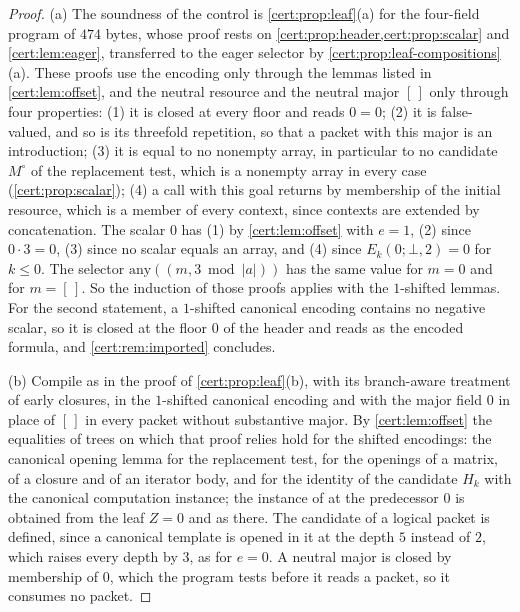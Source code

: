 \begin{proof}
(a) The soundness of the control is \cref{cert:prop:leaf}(a) for the
four-field program of $474$ bytes, whose proof rests on
\cref{cert:prop:header,cert:prop:scalar} and \cref{cert:lem:eager}, transferred
to the eager selector by \cref{cert:prop:leaf-compositions}(a). These proofs use
the encoding only through the lemmas listed in \cref{cert:lem:offset}, and the
neutral resource and the neutral major $[\,]$ only through four properties:
(1) it is closed at every floor and reads $0=0$; (2) it is false-valued, and
so is its threefold repetition, so that a packet with this major is an
introduction; (3) it is equal to no nonempty array, in particular to no
candidate $M^{\circ}$ of the replacement test, which is a nonempty array in
every case (\cref{cert:prop:scalar}); (4) a call with this goal returns by
membership of the initial resource, which is a member of every context, since
contexts are extended by concatenation. The scalar $0$ has (1) by
\cref{cert:lem:offset} with $e=1$, (2) since $0\cdot 3=0$, (3) since no scalar
equals an array, and (4) since $E_k(0;\bot,2)=0$ for $k\le 0$. The selector
$\mathrm{any}((m,3\bmod\lvert a\rvert))$ has the same value for $m=0$ and for
$m=[\,]$. So the induction of those proofs applies with the $1$-shifted lemmas.
For the second statement, a $1$-shifted canonical encoding contains no negative
scalar, so it is closed at the floor $0$ of the header and reads as the encoded
formula, and \cref{cert:rem:imported} concludes.

(b) Compile as in the proof of \cref{cert:prop:leaf}(b), with its
branch-aware treatment of early closures, in the $1$-shifted canonical encoding
and with the major field $0$ in place of $[\,]$ in every packet without
substantive major. By \cref{cert:lem:offset} the equalities of trees on which
that proof relies hold for the shifted encodings: the canonical opening lemma
for the replacement test, for the openings of a matrix, of a closure and of an
iterator body, and for the identity of the candidate $H_k$ with the canonical
computation instance; the instance of  at the predecessor $0$ is
obtained from the leaf $Z=0$ and  as there. The candidate of a
logical packet is defined, since a canonical template is opened in it at the
depth $5$ instead of $2$, which raises every depth by $3$, as for $e=0$. A
neutral major is closed by membership of $0$, which the program tests before
it reads a packet, so it consumes no packet.
\end{proof}

